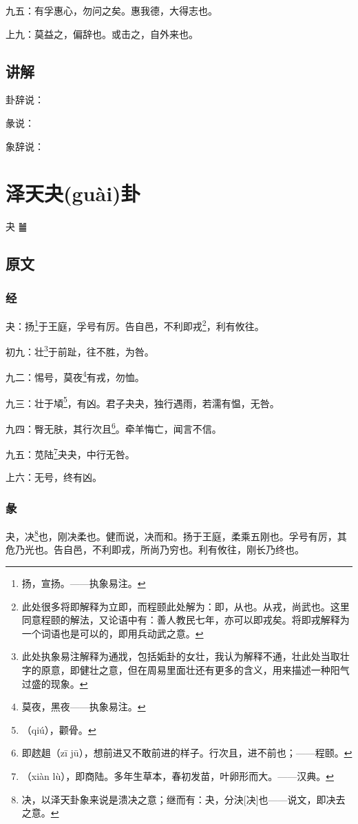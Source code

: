 \documentclass[12pt,oneside]{book}
\begin{document}
九五：有孚惠心，勿问之矣。惠我德，大得志也。

上九：莫益之，偏辞也。或击之，自外来也。

\section{讲解}
卦辞说：

彖说：

象辞说：

\chapter{泽天夬(guài)卦}
夬 {\Large ䷪}
\section{原文}

\subsection{经}
夬：扬\footnote{扬，宣扬。——执象易注。}于王庭，孚号有厉。告自邑，不利即戎\footnote{此处很多将即解释为立即，而程颐此处解为：即，从也。从戎，尚武也。这里同意程颐的解法，又论语中有：善人教民七年，亦可以即戎矣。将即戎解释为一个词语也是可以的，即用兵动武之意。}，利有攸往。

初九：壮\footnote{此处执象易注解释为通戕，包括姤卦的女壮，我认为解释不通，壮此处当取壮字的原意，即健壮之意，但在周易里面壮还有更多的含义，用来描述一种阳气过盛的现象。}于前趾，往不胜，为咎。

九二：惕号，莫夜\footnote{莫夜，黑夜——执象易注。}有戎，勿恤。

九三：壮于頄\footnote{（qiú），颧骨。}，有凶。君子夬夬，独行遇雨，若濡有愠，无咎。

九四：臀无肤，其行次且\footnote{即趑趄（zī jū），想前进又不敢前进的样子。行次且，进不前也；——程颐。}。牵羊悔亡，闻言不信。

九五：苋陆\footnote{（xiàn lù），即商陆。多年生草本，春初发苗，叶卵形而大。——汉典。}夬夬，中行无咎。

上六：无号，终有凶。

\subsection{彖}
夬，决\footnote{决，以泽天卦象来说是溃决之意；继而有：夬，分決[决]也——说文，即决去之意。}也，刚决柔也。健而说，决而和。扬于王庭，柔乘五刚也。孚号有厉，其危乃光也。告自邑，不利即戎，所尚乃穷也。利有攸往，刚长乃终也。
\end{document}
